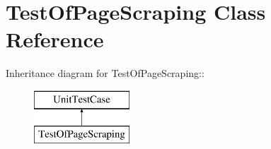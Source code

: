 \hypertarget{class_test_of_page_scraping}{
\section{TestOfPageScraping Class Reference}
\label{class_test_of_page_scraping}
}
Inheritance diagram for TestOfPageScraping::\begin{figure}[H]
\begin{center}
\leavevmode
\includegraphics[height=2cm]{class_test_of_page_scraping}
\end{center}
\end{figure}
